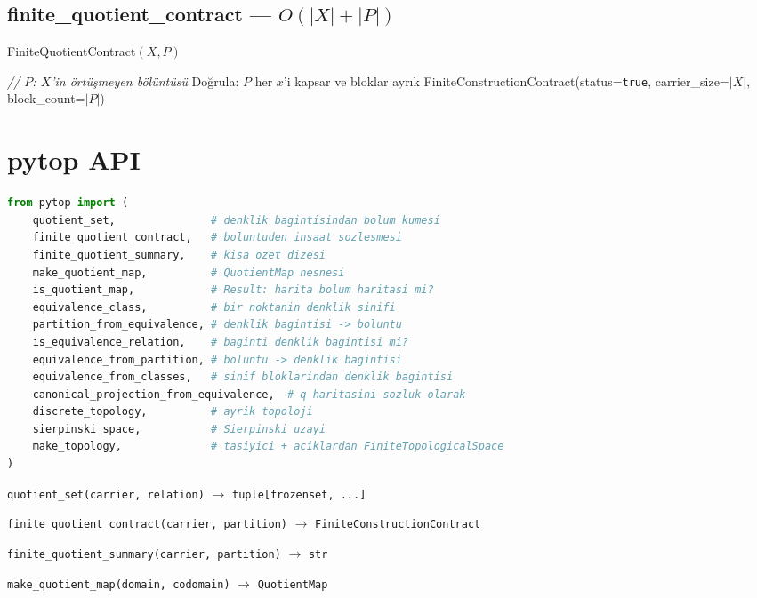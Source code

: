 \subsection{finite\_quotient\_contract — $O(|X| + |P|)$}

\begin{algorithm}
\caption{FiniteQuotientContract$(X, P)$}
\begin{algorithmic}[1]
\State \textit{// $P$: $X$'in örtüşmeyen bölüntüsü}
\State Doğrula: $P$ her $x$'i kapsar ve bloklar ayrık
\State \Return FiniteConstructionContract(status=\texttt{true}, carrier\_size=$|X|$, block\_count=$|P|$)
\end{algorithmic}
\end{algorithm}

\section{pytop API}

\begin{lstlisting}[language=Python]
from pytop import (
    quotient_set,               # denklik bagintisindan bolum kumesi
    finite_quotient_contract,   # boluntuden insaat sozlesmesi
    finite_quotient_summary,    # kisa ozet dizesi
    make_quotient_map,          # QuotientMap nesnesi
    is_quotient_map,            # Result: harita bolum haritasi mi?
    equivalence_class,          # bir noktanin denklik sinifi
    partition_from_equivalence, # denklik bagintisi -> boluntu
    is_equivalence_relation,    # baginti denklik bagintisi mi?
    equivalence_from_partition, # boluntu -> denklik bagintisi
    equivalence_from_classes,   # sinif bloklarindan denklik bagintisi
    canonical_projection_from_equivalence,  # q haritasini sozluk olarak
    discrete_topology,          # ayrik topoloji
    sierpinski_space,           # Sierpinski uzayi
    make_topology,              # tasiyici + aciklardan FiniteTopologicalSpace
)
\end{lstlisting}

\texttt{quotient\_set(carrier, relation)} $\to$ \texttt{tuple[frozenset, ...]}

\texttt{finite\_quotient\_contract(carrier, partition)} $\to$ \texttt{FiniteConstructionContract}

\texttt{finite\_quotient\_summary(carrier, partition)} $\to$ \texttt{str}

\texttt{make\_quotient\_map(domain, codomain)} $\to$ \texttt{QuotientMap}

